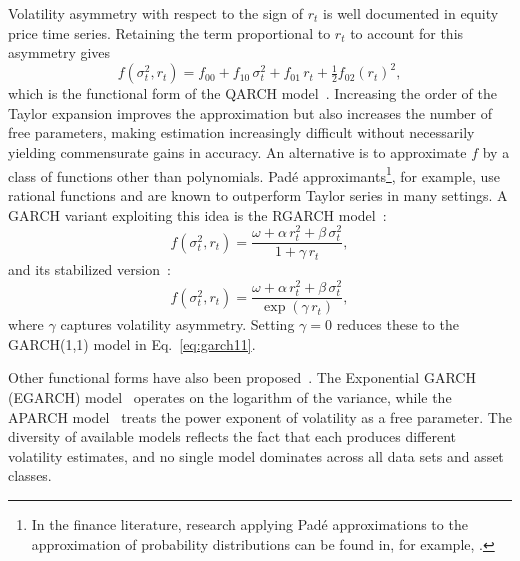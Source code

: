 \documentclass[preprints,article,accept,pdftex,oneauthor]{Definitions/mdpi}
\begin{document}
Volatility asymmetry with respect to the sign of $r_t$ is well
documented in equity price time series. Retaining the term proportional
to $r_t$ to account for this asymmetry gives
\begin{equation}
  f\!\left(\sigma_t^2, r_t\right)
  = f_{00} + f_{10}\,\sigma_t^2 + f_{01}\,r_t
    + \tfrac{1}{2}f_{02}\!\left(r_t\right)^2,
  \label{eq:qarch}
\end{equation}
which is the functional form of the QARCH
model~\cite{Sentana1995RES}. Increasing the order of the Taylor expansion
improves the approximation but also increases the number of free
parameters, making estimation increasingly difficult without necessarily
yielding commensurate gains in accuracy. An alternative is to
approximate $f$ by a class of functions other than polynomials.
Pad\'{e} approximants\footnote{In the finance literature, research applying Padé approximations to the approximation of probability distributions can be found in, for example, \cite{Nuyts2001Physica,alderweireld2004detailed, chen2013empirical}.}, for example, use rational functions and are known
to outperform Taylor series in many settings. A GARCH variant exploiting
this idea is the RGARCH model~\cite{takaishi2017rational}:
\begin{equation}
  f\!\left(\sigma_t^2, r_t\right)
  = \frac{\omega + \alpha\,r_t^2 + \beta\,\sigma_t^2}{1 + \gamma\,r_t},
  \label{eq:rgarch}
\end{equation}
and its stabilized version~\cite{takaishi2018volatility}:
\begin{equation}
  f\!\left(\sigma_t^2, r_t\right)
  = \frac{\omega + \alpha\,r_t^2 + \beta\,\sigma_t^2}{\exp(\gamma\,r_t)},
  \label{eq:rgarch}
\end{equation}
where $\gamma$ captures volatility asymmetry. Setting $\gamma = 0$
reduces these to the GARCH(1,1) model in Eq.~\eqref{eq:garch11}.


Other functional forms have also been proposed~\cite{bera1993arch}. The Exponential GARCH
(EGARCH) model~\cite{Nelson1991Econ} operates on the logarithm of the variance,
while the APARCH model~\cite{ding1993long} treats
the power exponent of volatility as a free parameter. The diversity of
available models reflects the fact that each produces different
volatility estimates, and no single model dominates across all data sets
and asset classes.
 
 
\end{document}
